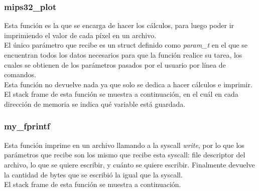 \documentclass[a4paper,10pt]{article}
\begin{document}
\subsubsection{mips32\_plot}
Esta función es la que se encarga de hacer los cálculos, para luego poder ir imprimiendo el valor de cada píxel en un archivo. \\
El único parámetro que recibe es un struct definido como \textit{param\_t} en el que se encuentran todos los datos necesarios para que la función realice su tarea, los cuales se obtienen de los parámetros pasados por el usuario por línea de comandos. \\
Esta función no devuelve nada ya que solo se dedica a hacer cálculos e imprimir. \\
El stack frame de esta función se muestra a continuación, en el cuál en cada dirección de memoria se indica qué variable está guardada.

\begin{center}
\begin{drawstack}
	\startframe
	 
	 
	 
	 
	\startframe
	 
	 
	 
	 
	\startframe
	 
	 
	 
	 
	\startframe
	 
	 
	 
	 
\end{drawstack}
\end{center}

\subsubsection{my\_fprintf}
Esta función imprime en un archivo llamando a la syscall \textit{write}, por lo que los parámetros que recibe son los mismo que recibe esta syscall: file descriptor del archivo, lo que se quiere escribir, y cuánto se quiere escribir. Finalmente devuelve la cantidad de bytes que se escribió la igual que la syscall. \\
El stack frame de esta función se muestra a continuación.

\begin{center}
\begin{drawstack}
	\startframe
	 
	 
	 
	 
	\startframe
	 
	 
	\startframe
	 
	 
	 
	 
\end{drawstack}
\end{center}
\end{document}

